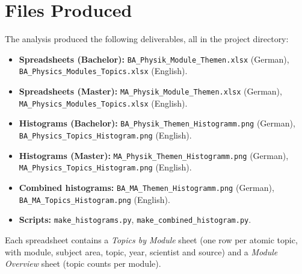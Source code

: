 \documentclass[11pt,a4paper]{article}
\newcommand{\fn}[1]{\nolinkurl{#1}}
\begin{document}
\section{Files Produced}
\label{sec:files}
The analysis produced the following deliverables, all in the project directory:
\begin{itemize}
  \item \textbf{Spreadsheets (Bachelor):}
        \fn{BA_Physik_Module_Themen.xlsx} (German),
        \fn{BA_Physics_Modules_Topics.xlsx} (English).
  \item \textbf{Spreadsheets (Master):}
        \fn{MA_Physik_Module_Themen.xlsx} (German),
        \fn{MA_Physics_Modules_Topics.xlsx} (English).
  \item \textbf{Histograms (Bachelor):}
        \fn{BA_Physik_Themen_Histogramm.png} (German),
        \fn{BA_Physics_Topics_Histogram.png} (English).
  \item \textbf{Histograms (Master):}
        \fn{MA_Physik_Themen_Histogramm.png} (German),
        \fn{MA_Physics_Topics_Histogram.png} (English).
  \item \textbf{Combined histograms:}
        \fn{BA_MA_Themen_Histogramm.png} (German),
        \fn{BA_MA_Topics_Histogram.png} (English).
  \item \textbf{Scripts:}
        \fn{make_histograms.py},
        \fn{make_combined_histogram.py}.
\end{itemize}
Each spreadsheet contains a \textit{Topics by Module} sheet (one row per atomic
topic, with module, subject area, topic, year, scientist and source) and a
\textit{Module Overview} sheet (topic counts per module).
\end{document}
